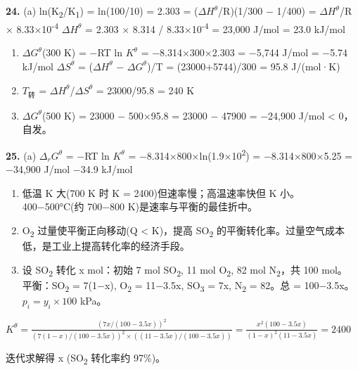 \textbf{24.}
(a) ln(K\textsubscript{2}/K\textsubscript{1}) = ln(100/10) = 2.303 = (\(\Delta H^\theta\)/R)(1/300 − 1/400) = \(\Delta H^\theta\)/R × 8.33×10\textsuperscript{-4}
\(\Delta H^\theta\) = 2.303 × 8.314 / 8.33×10\textsuperscript{-4} = 23,000 J/mol = 23.0 kJ/mol

\begin{enumerate}
\def\labelenumi{(\alph{enumi})}
\setcounter{enumi}{1}
\item
  \(\Delta G^\theta\)(300 K) = −RT ln \(K^\theta\) = −8.314×300×2.303 = −5,744 J/mol = −5.74 kJ/mol
  \(\Delta S^\theta\) = (\(\Delta H^\theta\) − \(\Delta G^\theta\))/T = (23000+5744)/300 = 95.8 J/(mol·K)
\item
  \(T_{转}\) = \(\Delta H^\theta\)/\(\Delta S^\theta\) = 23000/95.8 = 240 K
\item
  \(\Delta G^\theta\)(500 K) = 23000 − 500×95.8 = 23000 − 47900 = −24,900 J/mol \textless{} 0，自发。
\end{enumerate}

\textbf{25.}
(a) \(\Delta_r G^\theta\) = −RT ln \(K^\theta\) = −8.314×800×ln(1.9×10\textsuperscript{2}) = −8.314×800×5.25 = −34,900 J/mol  −34.9 kJ/mol

\begin{enumerate}
\def\labelenumi{(\alph{enumi})}
\setcounter{enumi}{1}
\item
  低温 K 大(700 K 时 K = 2400)但速率慢；高温速率快但 K 小。400−500°C(约 700−800 K)是速率与平衡的最佳折中。
\item
  O\textsubscript{2} 过量使平衡正向移动(Q \textless{} K)，提高 SO\textsubscript{2} 的平衡转化率。过量空气成本低，是工业上提高转化率的经济手段。
\item
  设 SO\textsubscript{2} 转化 x mol：初始 7 mol SO\textsubscript{2}, 11 mol O\textsubscript{2}, 82 mol N\textsubscript{2}，共 100 mol。
  平衡：SO\textsubscript{2} = 7(1−x), O\textsubscript{2} = 11−3.5x, SO\textsubscript{3} = 7x, N\textsubscript{2} = 82。总 = 100−3.5x。
  \(p_i = y_i \times 100\) kPa。
\end{enumerate}

\(K^\theta = \frac{(7x/(100-3.5x))^2}{(7(1-x)/(100-3.5x))^2 \times ((11-3.5x)/(100-3.5x))} = \frac{x^2(100-3.5x)}{(1-x)^2(11-3.5x)} = 2400\)

迭代求解得 x (SO\textsubscript{2} 转化率约 97\%)。
